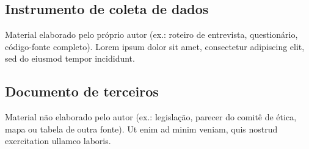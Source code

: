 \documentclass[mestrado,qualificacao]{packages/ppg}
\begin{document}
\begin{apendicesenv}
    \chapter{Instrumento de coleta de dados}
    \label{ape:questionario}
    Material elaborado pelo próprio autor (ex.: roteiro de entrevista,
    questionário, código-fonte completo). Lorem ipsum dolor sit amet,
    consectetur adipiscing elit, sed do eiusmod tempor incididunt.
\end{apendicesenv}

\begin{anexosenv}
    \chapter{Documento de terceiros}
    \label{anx:documento}
    Material não elaborado pelo autor (ex.: legislação, parecer do comitê de
    ética, mapa ou tabela de outra fonte). Ut enim ad minim veniam, quis nostrud
    exercitation ullamco laboris.
\end{anexosenv}
\end{document}

